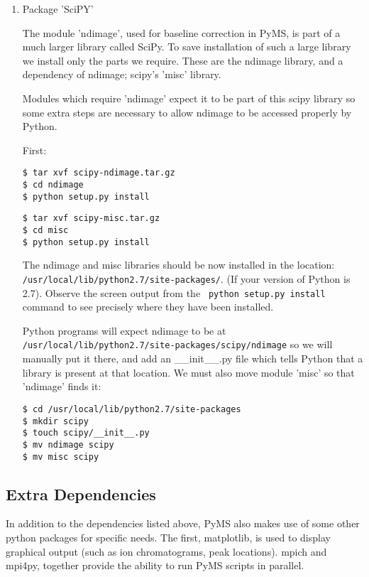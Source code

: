 \begin{enumerate}
\item Package 'SciPY'

The module 'ndimage', used for baseline correction in PyMS, is part
of a much larger library called SciPy. To save installation of such
a large library we install only the parts we require. These are the
ndimage library, and a dependency of ndimage; scipy's 'misc' library.

Modules which require 'ndimage' expect it to be part of this scipy
library so some extra steps are necessary to allow ndimage to be
accessed properly by Python.

First:

\begin{verbatim}
$ tar xvf scipy-ndimage.tar.gz
$ cd ndimage
$ python setup.py install
\end{verbatim}

\begin{verbatim}
$ tar xvf scipy-misc.tar.gz
$ cd misc
$ python setup.py install
\end{verbatim}

The ndimage and misc libraries should be now installed in the
location: {\tt /usr/local/lib/python2.7/site-packages/}.  (If your
version of Python is 2.7). Observe the screen output from the {\tt
  python setup.py install} command to see precisely where they have
been installed.

Python programs will expect ndimage to be at {\tt
  /usr/local/lib/python2.7/site-packages/scipy/ndimage} so we will
manually put it there, and add an \_\_init\_\_.py file which tells
Python that a library is present at that location. We must also move
module 'misc' so that 'ndimage' finds it:

\begin{verbatim}
$ cd /usr/local/lib/python2.7/site-packages
$ mkdir scipy
$ touch scipy/__init__.py
$ mv ndimage scipy
$ mv misc scipy
\end{verbatim}

\end{enumerate}

\subsection{Extra Dependencies}

In addition to the dependencies listed above, PyMS also makes use of
some other python packages for specific needs. The first, matplotlib,
is used to display graphical output (such as ion chromatograms, peak
locations). mpich and mpi4py, together provide the ability to run PyMS
scripts in parallel.

